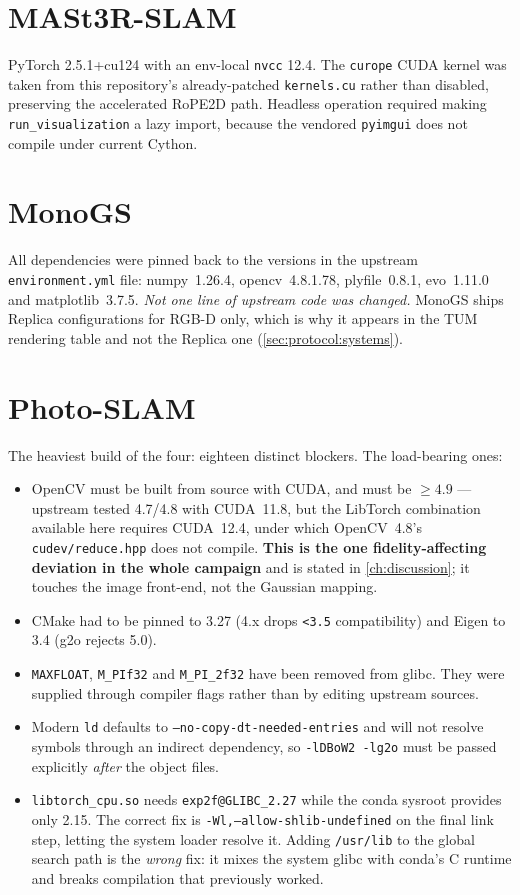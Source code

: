 \section{MASt3R-SLAM}
PyTorch 2.5.1+cu124 with an env-local \texttt{nvcc} 12.4. The \texttt{curope}
CUDA kernel was taken from this repository's already-patched
\texttt{kernels.cu} rather than disabled, preserving the accelerated RoPE2D
path. Headless operation required making \texttt{run\_visualization} a lazy
import, because the vendored \texttt{pyimgui} does not compile under current
Cython.

\section{MonoGS}
All dependencies were pinned back to the versions in the upstream
\texttt{environment.yml} file: numpy~1.26.4, opencv~4.8.1.78, plyfile~0.8.1,
evo~1.11.0 and matplotlib~3.7.5.
\emph{Not one line of upstream code was changed.} MonoGS ships Replica
configurations for RGB-D only, which is why it appears in the TUM rendering
table and not the Replica one (\cref{sec:protocol:systems}).

\section{Photo-SLAM}
The heaviest build of the four: eighteen distinct blockers. The load-bearing
ones:

\begin{itemize}\itemsep2pt
\item OpenCV must be built from source with CUDA, and must be $\ge 4.9$ ---
      upstream tested 4.7/4.8 with CUDA~11.8, but the LibTorch combination
      available here requires CUDA~12.4, under which OpenCV~4.8's
      \texttt{cudev/reduce.hpp} does not compile. \textbf{This is the one
      fidelity-affecting deviation in the whole campaign} and is stated in
      \cref{ch:discussion}; it touches the image front-end, not the Gaussian
      mapping.
\item CMake had to be pinned to 3.27 (4.x drops \texttt{<3.5} compatibility)
      and Eigen to 3.4 (g2o rejects 5.0).
\item \texttt{MAXFLOAT}, \texttt{M\_PIf32} and \texttt{M\_PI\_2f32} have been
      removed from glibc. They were supplied through compiler flags rather
      than by editing upstream sources.
\item Modern \texttt{ld} defaults to
      \texttt{--no-copy-dt-needed-entries} and will not resolve symbols
      through an indirect dependency, so \texttt{-lDBoW2 -lg2o} must be
      passed explicitly \emph{after} the object files.
\item \texttt{libtorch\_cpu.so} needs \texttt{exp2f@GLIBC\_2.27} while the
      conda sysroot provides only 2.15. The correct fix is
      \texttt{-Wl,--allow-shlib-undefined} on the final link step, letting the
      system loader resolve it. Adding \texttt{/usr/lib} to the global search
      path is the \emph{wrong} fix: it mixes the system glibc with conda's C
      runtime and breaks compilation that previously worked.
\end{itemize}

